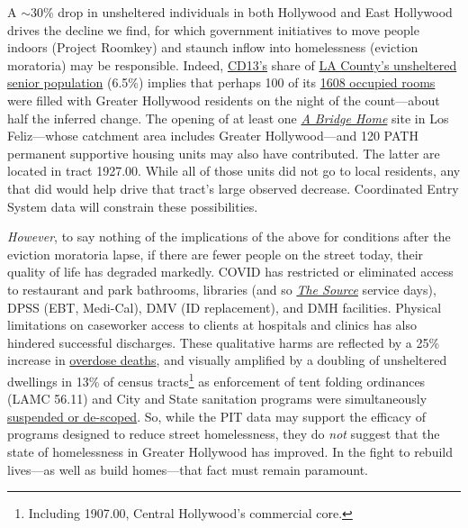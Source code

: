 \documentclass[11pt,twocolumn]{article}
\begin{document}
A $\sim$30\% drop in unsheltered individuals in both Hollywood and 
East Hollywood drives the decline we find, for which government initiatives to move people indoors 
(Project Roomkey) and staunch inflow into homelessness (eviction moratoria) may be responsible. 
Indeed, \href{https://www.lahsa.org/documents?id=4672-2020-homeless-count-council-district-13}{CD13's} share of \href{https://www.lahsa.org/documents?id=4585-2020-greater-los-angeles-homeless-count-los-angeles-continuum-of-care-coc-}{LA County's unsheltered senior population} (6.5\%) implies that perhaps 100 of its \href{https://projectroomkeytracker.com/}{1608 occupied rooms} were filled with Greater Hollywood residents on the night 
of the count---about half the inferred change. The opening of at least one 
\href{https://www.lamayor.org/ABridgeHome}{\it A Bridge Home} site in Los Feliz---whose catchment area 
includes Greater Hollywood---and 120 PATH permanent supportive housing units may also have contributed. 
The latter are located in tract 1927.00. While all of those units did not go to local residents, any that did would help
drive that tract's large observed decrease. Coordinated Entry System data will constrain these possibilities.

{\it However}, to say nothing of the implications of the above for conditions after the eviction moratoria
lapse, if there are fewer people on the street today, their quality of life has degraded markedly. COVID has restricted or 
eliminated access to restaurant and park bathrooms, libraries (and so 
\href{https://www.lapl.org/homeless-resources/the-source}{\it The Source} service days), DPSS 
(EBT, Medi-Cal), DMV (ID replacement), and DMH facilities. Physical limitations on caseworker 
access to clients at hospitals and clinics has also hindered successful discharges. These qualitative harms are reflected 
by a 25\% increase in 
\href{https://www.latimes.com/california/story/2021-01-07/the-powerful-synthetic-opioid-fentanyl-is-behind-rising-deaths-in-the-homeless-population}{overdose deaths}, and visually amplified by a doubling of unsheltered dwellings in 13\% of census 
tracts\footnote{Including 1907.00, Central Hollywood's commercial core.} as enforcement of tent folding ordinances
(LAMC 56.11) and City and State sanitation programs were simultaneously 
\href{https://clkrep.lacity.org/onlinedocs/2020/20-0147_misc_3-17-20_p.pdf}{suspended or de-scoped}. 
So, while the PIT data may support the efficacy of programs designed to reduce street 
homelessness, they do {\it not} suggest that the state of homelessness in Greater Hollywood has improved. In the 
fight to rebuild lives---as well as build homes---that fact must remain paramount.
\end{document}
